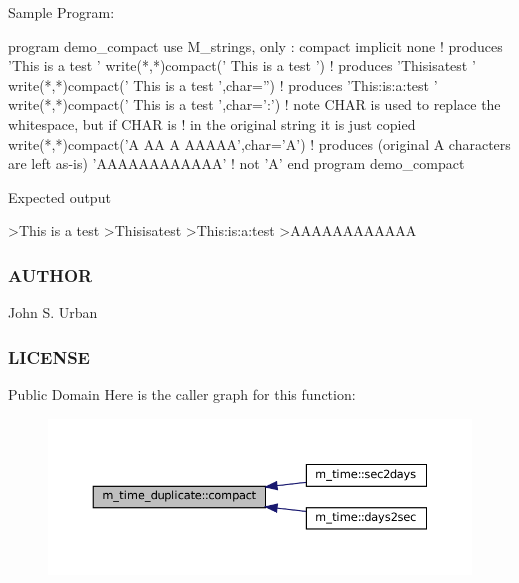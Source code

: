 \begin{DoxyVerb}Sample Program:

 program demo_compact
 use M_strings, only : compact
 implicit none
 ! produces 'This is a test               '
 write(*,*)compact('  This     is      a     test  ')
 ! produces 'Thisisatest                  '
 write(*,*)compact('  This     is      a     test  ',char='')
 ! produces 'This:is:a:test               '
 write(*,*)compact('  This     is      a     test  ',char=':')
 ! note CHAR is used to replace the whitespace, but if CHAR is
 ! in the original string it is just copied
 write(*,*)compact('A  AA    A   AAAAA',char='A')
 ! produces (original A characters are left as-is) 'AAAAAAAAAAAA'
 ! not 'A'
 end program demo_compact

Expected output

 >This is a test
 >Thisisatest
 >This:is:a:test
 >AAAAAAAAAAAA
\end{DoxyVerb}
 \subsubsection*{A\+U\+T\+H\+OR}

John S. Urban \subsubsection*{L\+I\+C\+E\+N\+SE}

Public Domain Here is the caller graph for this function\+:\nopagebreak
\begin{figure}[H]
\begin{center}
\leavevmode
\includegraphics[width=350pt]{namespacem__time__duplicate_a20fc022f66383c65302e990c00432f38_icgraph}
\end{center}
\end{figure}
\mbox{\label{namespacem__time__duplicate_a84f53c1e0d6c1c9fe70b19549921d14b}} 
